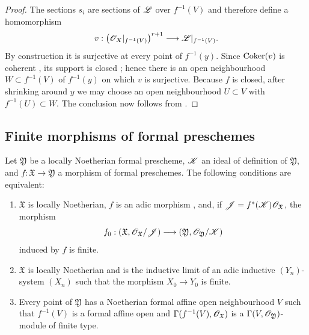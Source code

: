 \begin{proof}
The sections $s_i$ are sections of $\mathscr{L}$ over $f^{-1}(V)$ and
therefore define a homomorphism
\[
  v:
  \bigl(\mathscr{O}_X|_{f^{-1}(V)}\bigr)^{r+1}
  \longrightarrow
  \mathscr{L}|_{f^{-1}(V)}.
\]
By construction it is surjective at every point of $f^{-1}(y)$.
Since $\operatorname{Coker}(v)$ is coherent , its support is
closed ; hence there is an open neighbourhood
$W\subset f^{-1}(V)$ of $f^{-1}(y)$ on which $v$ is surjective.
Because $f$ is closed, after shrinking around $y$ we may choose an
open neighbourhood $U\subset V$ with $f^{-1}(U)\subset W$.
The conclusion now follows from .
\end{proof}


\subsection{Finite morphisms of formal preschemes}
\label{subsection:III.4.8}

\begin{proposition}[4.8.1]
\label{III.4.8.1}
Let $\mathfrak{Y}$ be a locally Noetherian formal prescheme,
$\mathscr{K}$ an ideal of definition of $\mathfrak{Y}$, and
$f:\mathfrak{X}\to\mathfrak{Y}$ a morphism of formal preschemes.
The following conditions are equivalent:
\begin{enumerate}
  \item[\rm{a)}] $\mathfrak{X}$ is locally Noetherian, $f$ is an
    adic morphism , and, if
    $\mathscr{J}=f^*(\mathscr{K})\mathscr{O}_{\mathfrak{X}}$, the morphism
    \[
      f_0:
      (\mathfrak{X},\mathscr{O}_{\mathfrak{X}}/\mathscr{J})
      \longrightarrow
      (\mathfrak{Y},\mathscr{O}_{\mathfrak{Y}}/\mathscr{K})
    \]
    induced by $f$ is finite.
  \item[\rm{b)}] $\mathfrak{X}$ is locally Noetherian and is the
    inductive limit of an adic inductive $(Y_n)$-system $(X_n)$
    such that the morphism $X_0\to Y_0$ is finite.
  \item[\rm{c)}] Every point of $\mathfrak{Y}$ has a Noetherian
    formal affine open neighbourhood $V$ such that $f^{-1}(V)$ is
    a formal affine open and
    $\Gamma(f^{-1}(V),\mathscr{O}_{\mathfrak{X}})$ is a
    $\Gamma(V,\mathscr{O}_{\mathfrak{Y}})$-module of finite type.
\end{enumerate}
\end{proposition}


